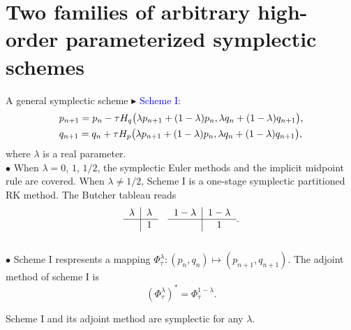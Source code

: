 \documentclass[10pt]{beamer}
\begin{document}
\section{Two families of arbitrary high-order parameterized symplectic schemes}
\begin{frame}{A general symplectic scheme}
\textcolor[rgb]{0,0,1}{$\blacktriangleright$} \textcolor{blue}{Scheme I:}
\begin{align}\label{eq-7}
\aligned
&p_{n+1}=p_n-\tau H_q\big(\lambda p_{n+1}+(1-\lambda)p_n,\lambda q_n+(1-\lambda)q_{n+1}\big),\\
&q_{n+1}=q_n+\tau H_p\big(\lambda p_{n+1}+(1-\lambda)p_n,\lambda q_n+(1-\lambda)q_{n+1}\big),\\
\endaligned
\end{align}
where $\lambda$ is a real parameter.\\
\vspace{2mm}
\quad\textcolor[rgb]{0,0,1}{$\bullet$} When $\lambda=0$, $1$, $1/2$, the symplectic Euler methods and the implicit midpoint rule are covered. When $\lambda\neq 1/2$, Scheme I is a one-stage symplectic partitioned RK method. The Butcher tableau reads
\begin{equation}\label{eq-8}
\begin{tabular}{c|c}
$\lambda$ & $\lambda$\\ \hline
& $1$\
\end{tabular}\quad
\begin{tabular}{c|c}
$1-\lambda$ & $1-\lambda$\\ \hline
& $1$\\
\end{tabular}.
\end{equation}\\

\quad\textcolor[rgb]{0,0,1}{$\bullet$} Scheme I respresents a mapping $\Phi_\tau^{\lambda}: (p_n,q_n) \mapsto (p_{n+1},q_{n+1})$. The adjoint method of scheme I is
\begin{equation}\label{eq-9}
(\Phi_\tau^{\lambda})^*=\Phi_\tau^{1-\lambda}.
\end{equation}	

\begin{theorem}
Scheme I and its adjoint method are symplectic for any $\lambda$.
\end{theorem}
\end{frame}	
\end{document}
